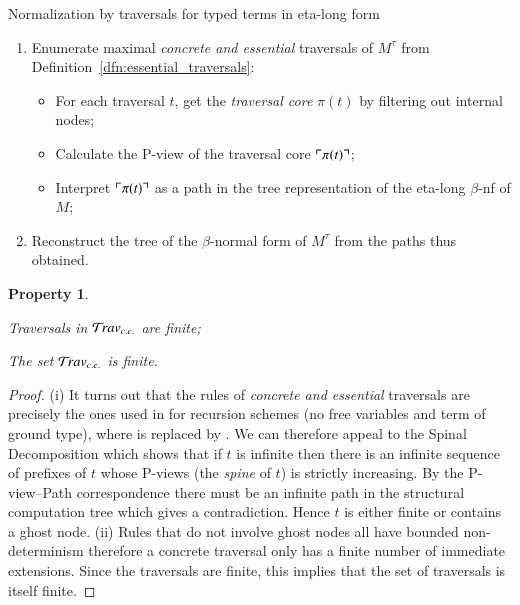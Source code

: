 \documentclass{elsarticle}
\theoremstyle{plain}
\newtheorem{property}[theorem]{Property}
\theoremstyle{definition}
\theoremstyle{remark}
\newcommand{\travsetcones}{{\travset_{c.e.}}} %
\def\coresymbol{\pi} %
\newcommand{\core}[1]{\coresymbol(#1)} %
\begin{document}
\begin{algorithm}[!ht]
\caption{Normalization by traversals for typed terms in eta-long form}
\label{algo:stlc_normalization_by_traversals}
\begin{algorithmic}
\begin{enumerate}[nosep]
  \item Enumerate maximal \emph{concrete and essential} traversals of $M^\tau$ from Definition~\ref{dfn:essential_traversals}:
  \begin{itemize}[nosep]
  \item For each traversal $t$, get the \emph{traversal core} $\core{t}$ by filtering out internal nodes;
  \item Calculate the P-view of the traversal core $\pview{\core{t}}$;
  \item Interpret $\pview{\core{t}}$ as a path in the tree representation of the eta-long $\beta$-nf of $M$;
  \end{itemize}
  \item Reconstruct the tree of the $\beta$-normal form of $M^\tau$ from the paths thus obtained.
\end{enumerate}
\end{algorithmic}
\end{algorithm}

\begin{property}
    \label{prop:concrete_essential_trav_finite}
    \begin{enumerate*}
        \item[(i)] Traversals in $\travsetcones$ are finite;
        \item[(ii)] The set $\travsetcones$ is finite.
    \end{enumerate*}
    \end{property}
    \begin{proof}
    (i) It turns out that the rules of \emph{concrete and essential} traversals are precisely the ones used in \cite{OngLics2006} for recursion schemes (no free variables and term of ground type), where  is replaced by . We can therefore appeal to the Spinal Decomposition
    \cite[Lemma 8]{OngLics2006} which shows that if $t$ is infinite then there is an infinite sequence of prefixes of $t$ whose P-views (the \emph{spine} of $t$) is strictly increasing. By the P-view--Path correspondence there must be an infinite path in the structural computation tree which gives a contradiction. Hence $t$ is either finite or contains a ghost node.
    (ii) Rules that do not involve ghost nodes all have bounded non-determinism therefore a concrete traversal only has a finite number of immediate extensions. Since the traversals are finite, this implies that the set of traversals is itself finite.
\end{proof}
\end{document}
